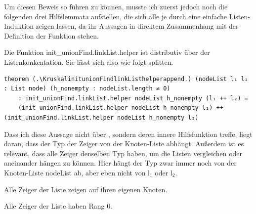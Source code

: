 Um diesen Beweis so führen zu können, musste ich zuerst jedoch noch die folgenden drei Hilfslemmata aufstellen, die sich alle je durch eine einfache Listen-Induktion zeigen lassen,
da ihr Aussagen in direktem Zusammenhang mit der Definition der Funktion stehen.
\begin{lemma}[\KruskalinitunionFindlinkListhelperappend]\label{KruskalinitunionFindlinkListhelperappend}
  Die Funktion init\_unionFind.linkList.helper ist distributiv über der Listenkonkentation.
  Sie lässt sich also wie folgt splitten.
\end{lemma}
\begin{lstlisting}
theorem (.\KruskalinitunionFindlinkListhelperappend.) (nodeList l₁ l₂ : List node) (h_nonempty : nodeList.length ≠ 0)
    : init_unionFind.linkList.helper nodeList h_nonempty (l₁ ++ l₂) =
    (init_unionFind.linkList.helper nodeList h_nonempty l₁) ++ (init_unionFind.linkList.helper nodeList h_nonempty l₂)
\end{lstlisting}

Dass ich diese Aussage nicht über \KruskalinitunionFindlinkList, sondern deren innere Hilfsfunktion treffe, liegt daran, dass der Typ der Zeiger von der Knoten-Liste abhängt.
Außerdem ist es relevant, dass alle Zeiger denselben Typ haben, um die Listen vergleichen oder aneinander hängen zu können.
Hier hängt der Typ zwar immer noch von der Knoten-Liste nodeList ab, aber eben nicht von l$_1$ oder l$_2$.

\begin{lemma}[\KruskalinitunionFindlinkListhelperallselfconnected]\label{KruskalinitunionFindlinkListhelperallselfconnected}
  Alle Zeiger der Liste zeigen auf ihren eigenen Knoten.
\end{lemma}

\begin{lemma}[\KruskalinitunionFindlinkListhelperallrankzero]
  Alle Zeiger der Liste haben Rang 0.
\end{lemma}

